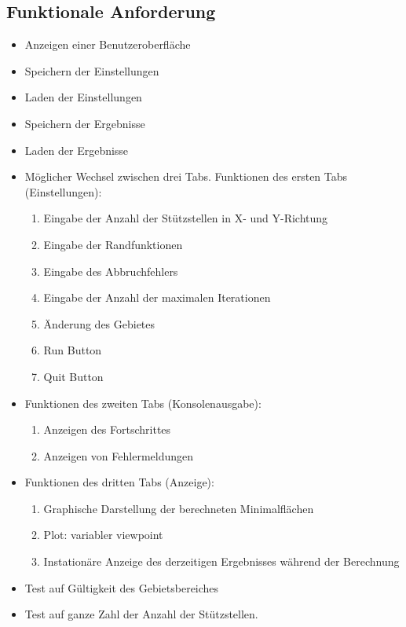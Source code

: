\subsection{Funktionale Anforderung}
\begin{itemize}
\item Anzeigen einer Benutzeroberfl\"ache
\item Speichern der Einstellungen
\item Laden der Einstellungen
\item Speichern der Ergebnisse
\item Laden der Ergebnisse
\item M\"oglicher Wechsel zwischen drei Tabs. Funktionen des ersten Tabs (Einstellungen):
	\begin{enumerate}
	\item Eingabe der Anzahl der St\"utzstellen in X- und Y-Richtung
	\item Eingabe der Randfunktionen
	\item Eingabe des Abbruchfehlers
	\item Eingabe der Anzahl der maximalen Iterationen
	\item \"Anderung des Gebietes
	\item Run Button
	\item Quit Button
	\end{enumerate}
\item Funktionen des zweiten Tabs (Konsolenausgabe):
	\begin{enumerate}
	\item Anzeigen des Fortschrittes
	\item Anzeigen von Fehlermeldungen
	\end{enumerate}
\item Funktionen des dritten Tabs (Anzeige):
	\begin{enumerate}
	\item Graphische Darstellung der berechneten Minimalfl\"achen
	\item Plot: variabler viewpoint
	\item Instation\"are Anzeige des derzeitigen Ergebnisses w\"ahrend der Berechnung
	\end{enumerate}
\item Test auf G\"ultigkeit des Gebietsbereiches
\item Test auf ganze Zahl der Anzahl der St\"utzstellen.
\end{itemize}
